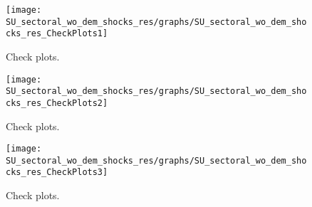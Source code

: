  
\begin{figure}[H]
\centering 
\texttt{[image: SU\_sectoral\_wo\_dem\_shocks\_res/graphs/SU\_sectoral\_wo\_dem\_shocks\_res\_CheckPlots1]}
\caption{Check plots.}\label{Fig:CheckPlots:1}
\end{figure}
 
\begin{figure}[H]
\centering 
\texttt{[image: SU\_sectoral\_wo\_dem\_shocks\_res/graphs/SU\_sectoral\_wo\_dem\_shocks\_res\_CheckPlots2]}
\caption{Check plots.}\label{Fig:CheckPlots:2}
\end{figure}
 
\begin{figure}[H]
\centering 
\texttt{[image: SU\_sectoral\_wo\_dem\_shocks\_res/graphs/SU\_sectoral\_wo\_dem\_shocks\_res\_CheckPlots3]}
\caption{Check plots.}\label{Fig:CheckPlots:3}
\end{figure}
 
